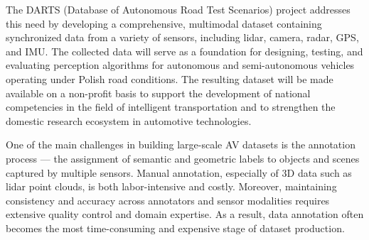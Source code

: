 \documentclass[conference]{IEEEtran}
\begin{document}
The DARTS (Database of Autonomous Road Test Scenarios) project addresses this need by developing a comprehensive, multimodal dataset containing synchronized data from a variety of sensors, including lidar, camera, radar, GPS, and IMU. The collected data will serve as a foundation for designing, testing, and evaluating perception algorithms for autonomous and semi-autonomous vehicles operating under Polish road conditions. The resulting dataset will be made available on a non-profit basis to support the development of national competencies in the field of intelligent transportation and to strengthen the domestic research ecosystem in automotive technologies.

One of the main challenges in building large-scale AV datasets is the annotation process — the assignment of semantic and geometric labels to objects and scenes captured by multiple sensors. Manual annotation, especially of 3D data such as lidar point clouds, is both labor-intensive and costly\cite{b4}. Moreover, maintaining consistency and accuracy across annotators and sensor modalities requires extensive quality control and domain expertise. As a result, data annotation often becomes the most time-consuming and expensive stage of dataset production.


\end{document}
